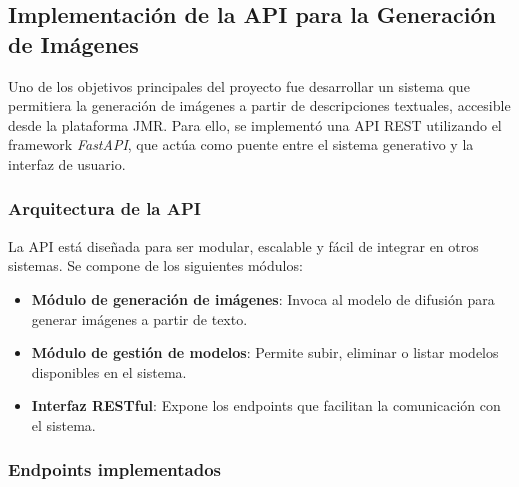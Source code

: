 \subsection{Implementación de la API para la Generación de Imágenes}
Uno de los objetivos principales del proyecto fue desarrollar un sistema que permitiera la generación de imágenes a partir de descripciones textuales, accesible desde la plataforma JMR. Para ello, se implementó una API REST utilizando el framework \textit{FastAPI}, que actúa como puente entre el sistema generativo y la interfaz de usuario.

\subsubsection{Arquitectura de la API}
La API está diseñada para ser modular, escalable y fácil de integrar en otros sistemas. Se compone de los siguientes módulos:

\begin{itemize}
    \item \textbf{Módulo de generación de imágenes}: Invoca al modelo de difusión para generar imágenes a partir de texto.
    \item \textbf{Módulo de gestión de modelos}: Permite subir, eliminar o listar modelos disponibles en el sistema.
    \item \textbf{Interfaz RESTful}: Expone los endpoints que facilitan la comunicación con el sistema.
\end{itemize}

\subsubsection{Endpoints implementados}

